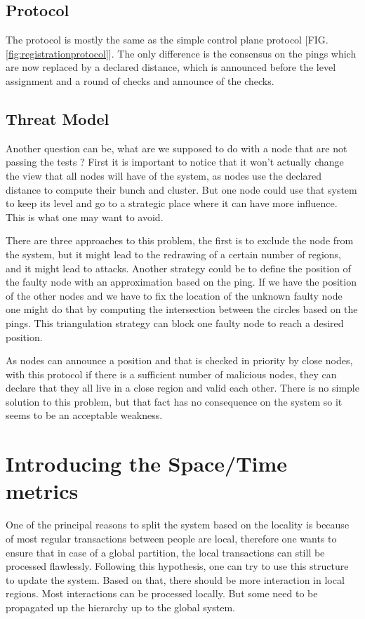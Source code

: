 \documentclass[a4paper,11pt,oneside]{report}
\begin{document}
\subsection{Protocol}
The protocol is mostly the same as the simple control plane protocol [FIG.
\autoref{fig:registrationprotocol}]. The only difference is the consensus on the
pings which are now replaced by a declared distance, which is announced before
the level assignment and a round of checks and announce of the checks. 

\subsection{Threat Model}
Another question can be, what are we supposed to do with a node that are not
passing the tests ? First it is important to notice that it won't actually
change the view that all nodes will have of the system, as nodes use the
declared distance to compute their bunch and cluster. But one node could use
that system to keep its level and go to a strategic place where it can have
more influence. This is what one may want to avoid. 

There are three approaches to this problem, the first is to exclude the node
from the system, but it might lead to the redrawing of a certain number of
regions, and it might lead to attacks. Another strategy could be to define the
position of the faulty node with an approximation based on the ping. If we have
the position of the other nodes and we have to fix the location of the unknown
faulty node one might do that by computing the intersection between the circles
based on the pings. This triangulation strategy can block one faulty node to
reach a desired position. 

As nodes can announce a position and that is checked in priority by close
nodes, with this protocol if there is a sufficient number of malicious nodes,
they can declare that they all live in a close region and valid each other.
There is no simple solution to this problem, but that fact has no consequence
on the system so it seems to be an acceptable weakness.

\section{Introducing the Space/Time metrics}
One of the principal reasons to split the system based on the locality is
because of most regular transactions between people are local, therefore one
wants to ensure that in case of a global partition, the local transactions can
still be processed flawlessly. Following this hypothesis, one can try to use
this structure to update the system. Based on that, there should be more
interaction in local regions. Most interactions can be processed locally. But
some need to be propagated up the hierarchy up to the global system. 
\end{document}
